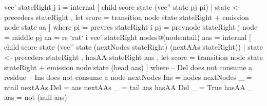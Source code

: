 vee' stateRight j i =
  internal [ child score state (vee'' state pj pi)
           | state <- preceders stateRight
           , let score = transition node state stateRight
                         + emission node state aa
           ]
  where pi = prevres  stateRight i
        pj = prevnode stateRight j
        node = middle pj
        aa = rs `rat` i
       vee' stateRight nodes@(node:ntail) aas =
         internal [ child score state (vee'' state (nextNodes stateRight)
                                         (nextAAs   stateRight))
        | state <- preceders stateRight
        , hasAA stateRight aas
        , let score = transition node state stateRight
                      + emission node state (head aas)
        ]
         where -- Del does not consume a residue
     -- Ins does not consume a node
     nextNodes Ins = nodes
     nextNodes _   = ntail
     nextAAs Del   = aas
     nextAAs _     = tail aas
     hasAA Del _   = True
     hasAA _  aas  = not (null aas)

